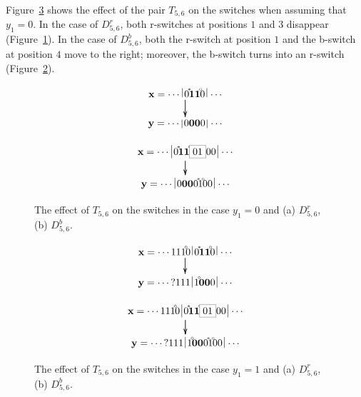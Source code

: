 \documentclass{sn-jnl}
\newcommand{\lllp}{\vline}
\newcommand{\bx}{\mathbf{x}}
\newcommand{\by}{\mathbf{y}}
\newcommand{\gn}[1]{\!^{{}^{{#1}}}\!\!}
\begin{document}
Figure~\ref{fig:t5t6} shows the effect of the pair $T_{5,6}$ on the switches when assuming that $y_1=0$.
In the case of $D_{5,6}^r$, both r-switches at positions $1$ and $3$ disappear (Figure~\ref{fig:t5t6(a)}).
In the case of $D_{5,6}^b$, both the r-switch at position $1$ and the b-switch at position $4$ move to the right; 
moreover, the b-switch turns into an r-switch (Figure~\ref{fig:t5t6(b)}).
\begin{figure}[h!b]
    \centering
    \begin{subfigure}{0.46\textwidth}
{\scriptsize\[
\xymatrix@C=0.2cm@R=0.5cm{ 
\bx = \cdots \;\lllp  0\gn{*}\boldsymbol{11}\gn{\circ} \ar[d]  0\,\lllp\,\cdots\ar[d]  \\
\by = \cdots \;\lllp 0\boldsymbol{00} 0\,\lllp\,\cdots 
}
\]}
    \caption{}
    \label{fig:t5t6(a)}
\end{subfigure}
\hfill
\begin{subfigure}{0.45\textwidth}
{\scriptsize\[
\xymatrix@C=0.2cm@R=0.5cm{ 
\bx = \cdots \;\lllp  0\gn{*}\boldsymbol{11}\gn{\circ} \ar[d]  \fcolorbox{gray}{white}{01}00\,\lllp\,\cdots\ar[d]  \\
\by = \cdots \;\lllp 0\boldsymbol{00}0   \gn{*}1\gn{\circ}00\,\lllp\,\cdots 
}
\]}
    \caption{}
    \label{fig:t5t6(b)} 
\end{subfigure}
\caption{The effect of $T_{5,6}$ on the switches in the case $y_1=0$ and (a) $D_{5,6}^r$, (b) $D_{5,6}^b$.}\label{fig:t5t6}
\end{figure}
\begin{figure}[h!b]
    \centering
    \begin{subfigure}{0.46\textwidth}
{\scriptsize\[
\xymatrix@C=0.2cm@R=0.5cm{ 
\bx = \cdots 111\gn{\diamond}0\,\lllp \, 0\gn{*}\boldsymbol{11}\gn{\circ} \ar[d]  0\,\lllp\,\cdots\ar[d]  \\
\by = \cdots \,?111\,\lllp\,1\gn{\diamond}\boldsymbol{00} 0\,\lllp\,\cdots 
}
\]}
    \caption{}
    \label{fig:t5t6-cd(a)}
\end{subfigure}
\hfill
\begin{subfigure}{0.45\textwidth}
{\scriptsize\[
\xymatrix@C=0.2cm@R=0.5cm{ 
\bx = \cdots 111\gn{\diamond}0\,\lllp \, 0\gn{*}\boldsymbol{11}\gn{\circ} \ar[d]  \fcolorbox{gray}{white}{01}00\,\lllp\,\cdots\ar[d]  \\
\by = \cdots \, ?111\,\lllp\,1\gn{\diamond}\boldsymbol{00}0   \gn{*}1\gn{\circ}00\,\lllp\,\cdots 
}
\]}
    \caption{}
    \label{fig:t5t6-cd(b)} 
\end{subfigure}
\caption{The effect of $T_{5,6}$ on the switches in the case $y_1=1$ and (a) $D_{5,6}^r$, (b) $D_{5,6}^b$.}\label{fig:t5t6-cd}
\end{figure}
\end{document}
